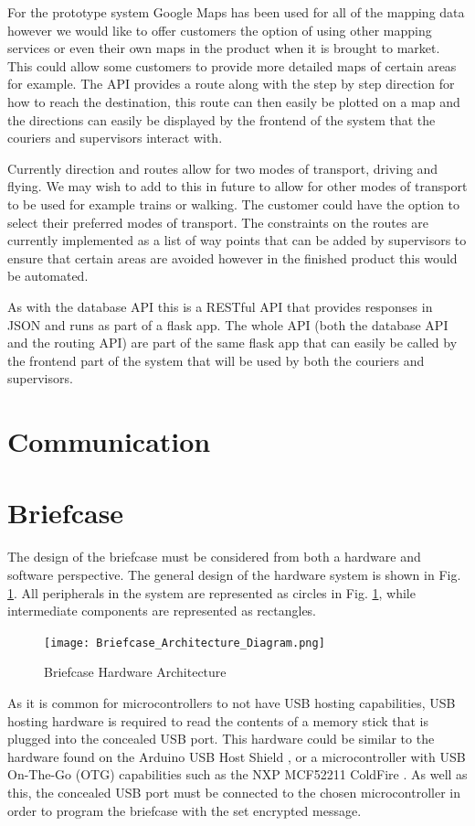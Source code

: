 For the prototype system Google Maps has been used for all of the mapping data however we would like to offer customers the option of using other mapping services or even their own maps in the product when it is brought to market. This could allow some customers to provide more detailed maps of certain areas for example. The API provides a route along with the step by step direction for how to reach the destination, this route can then easily be plotted on a map and the directions can easily be displayed by the frontend of the system that the couriers and supervisors interact with.

Currently direction and routes allow for two modes of transport, driving and flying. We may wish to add to this in future to allow for other modes of transport to be used for example trains or walking. The customer could have the option to select their preferred modes of transport. The constraints on the routes are currently implemented as a list of way points that can be added by supervisors to ensure that certain areas are avoided however in the finished product this would be automated.

As with the database API this is a RESTful API that provides responses in JSON and runs as part of a flask app. The whole API (both the database API and the routing API) are part of the same flask app that can easily be called by the frontend part of the system that will be used by both the couriers and supervisors.

\section{Communication}

\section{Briefcase}
The design of the briefcase must be considered from both a hardware and software perspective. The general design of the hardware system is shown in Fig. \ref{fig:briefcase_architecture}. All peripherals in the system are represented as circles in Fig. \ref{fig:briefcase_architecture}, while intermediate components are represented as rectangles.
\begin{figure}[h]
    \centering
    \texttt{[image: Briefcase\_Architecture\_Diagram.png]}
    \caption{Briefcase Hardware Architecture}
    \label{fig:briefcase_architecture}
\end{figure}

As it is common for microcontrollers to not have USB hosting capabilities, USB hosting hardware is required to read the contents of a memory stick that is plugged into the concealed USB port. This hardware could be similar to the hardware found on the Arduino USB Host Shield \cite{arduinoUSBHost}, or a microcontroller with USB On-The-Go (OTG) capabilities \cite{techopediaUSBOTG} such as the NXP MCF52211 ColdFire \cite{nxpDatasheet}. As well as this, the concealed USB port must be connected to the chosen microcontroller in order to program the briefcase with the set encrypted message.

